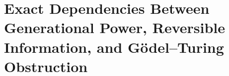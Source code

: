 
\chapter{Exact Dependencies Between Generational Power, Reversible Information, and Gödel–Turing Obstruction}
\label{app:integracion-vn64-controles}

\HMTDemoteHeadings

\HMTRestoreHeadings
